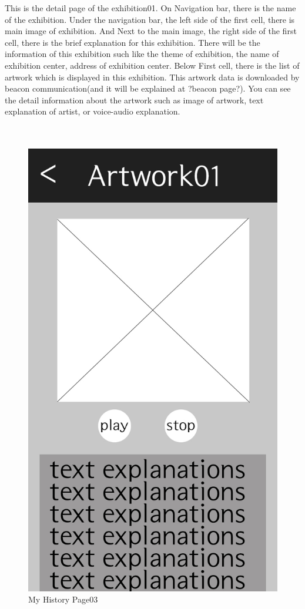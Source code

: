 \documentclass[conference]{IEEEtran}
\begin{document}
This is the detail page of the exhibition01. On Navigation bar, there is the name of the exhibition. Under the navigation bar, the left side of the first cell,  there is main image of exhibition. And Next to the main image, the right side of the first cell, there is the brief explanation for this exhibition. There will be the information of this exhibition such like the theme of exhibition, the name of exhibition center, address of exhibition center. Below First cell, there is the list of artwork which is displayed in this exhibition. This artwork data is downloaded by beacon communication(and it will be explained at ?beacon page?). You can see the detail information about the artwork such as image of artwork, text explanation of artist, or voice-audio explanation. \\\\\

\begin{figure}[htbp]
\begin{center}
    \includegraphics[scale=0.15]{img_exhiDetail02}
    \caption{My History Page03} 
\end{center}
\end{figure}
\end{document}
